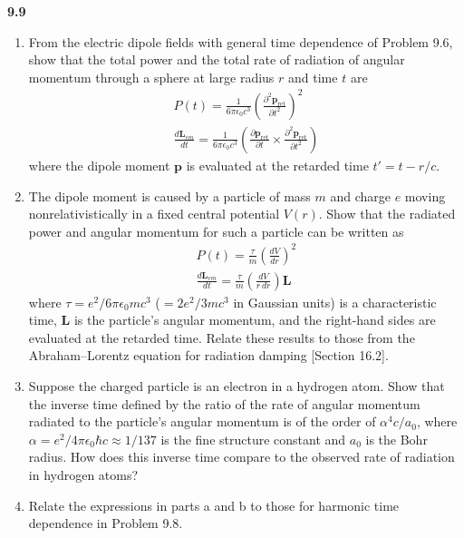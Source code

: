 \par\bigskip
\noindent\textbf{9.9}\quad\begin{enumerate}
\item[(a)] From the electric dipole fields with general time dependence of Problem 9.6, show that the total power and the total rate of radiation of angular momentum through a sphere at large radius $r$ and time $t$ are
\begin{gather*}
P(t)=\frac{1}{6\pi\epsilon_{0}c^{3}}\left(\frac{\partial^{2}\mathbf{p}_{\mathrm{ret}}}{\partial t^{2}}\right)^{2}\\[4pt]
\frac{d\mathbf{L}_{em}}{dt}=\frac{1}{6\pi\epsilon_{0}c^{3}}\left(\frac{\partial\mathbf{p}_{\mathrm{ret}}}{\partial t}\times\frac{\partial^{2}\mathbf{p}_{\mathrm{ret}}}{\partial t^{2}}\right)
\end{gather*}
where the dipole moment $\mathbf{p}$ is evaluated at the retarded time $t'=t-r/c$.
\item[(b)] The dipole moment is caused by a particle of mass $m$ and charge $e$ moving nonrelativistically in a fixed central potential $V(r)$. Show that the radiated power and angular momentum for such a particle can be written as
\begin{gather*}
P(t)=\frac{\tau}{m}\left(\frac{dV}{dr}\right)^{2}\\[4pt]
\frac{d\mathbf{L}_{em}}{dt}=\frac{\tau}{m}\left(\frac{dV}{r\,dr}\right)\mathbf{L}
\end{gather*}
where $\tau=e^{2}/6\pi\epsilon_{0}mc^{3}$ ($=2e^{2}/3mc^{3}$ in Gaussian units) is a characteristic time, $\mathbf{L}$ is the particle's angular momentum, and the right-hand sides are evaluated at the retarded time. Relate these results to those from the Abraham--Lorentz equation for radiation damping [Section 16.2].
\item[(c)] Suppose the charged particle is an electron in a hydrogen atom. Show that the inverse time defined by the ratio of the rate of angular momentum radiated to the particle's angular momentum is of the order of $\alpha^{4}c/a_{0}$, where $\alpha=e^{2}/4\pi\epsilon_{0}\hbar c\approx1/137$ is the fine structure constant and $a_{0}$ is the Bohr radius. How does this inverse time compare to the observed rate of radiation in hydrogen atoms?
\item[(d)] Relate the expressions in parts a and b to those for harmonic time dependence in Problem 9.8.
\end{enumerate}
\solution

